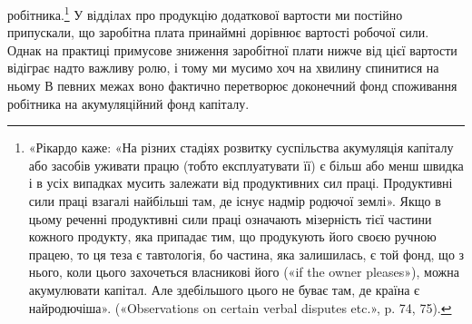 \parcont{}  %
робітника.\footnote{
«Рікардо каже: «На різних стадіях розвитку суспільства акумуляція
капіталу або засобів уживати працю (тобто експлуатувати її)
є більш або менш швидка і в усіх випадках мусить залежати від продуктивних
сил праці. Продуктивні сили праці взагалі найбільші там, де
існує надмір родючої землі». Якщо в цьому реченні продуктивні сили
праці означають мізерність тієї частини кожного продукту, яка припадає
тим, що продукують його своєю ручною працею, то ця теза є тавтологія,
бо частина, яка залишилась, є той фонд, що з нього, коли цього захочеться
власникові його («if the owner pleases»), можна акумулювати капітал.
Але здебільшого цього не буває там, де країна є найродючіша».
(«Observations on certain verbal disputes etc.», p. 74, 75).
} У відділах про продукцію додаткової вартости ми
постійно припускали, що заробітна плата принаймні дорівнює
вартості робочої сили. Однак на практиці примусове зниження
заробітної плати нижче від цієї вартости відіграє надто важливу
ролю, і тому ми мусимо хоч на хвилину спинитися на ньому
В певних межах воно фактично перетворює доконечний фонд
споживання робітника на акумуляційний фонд капіталу.


